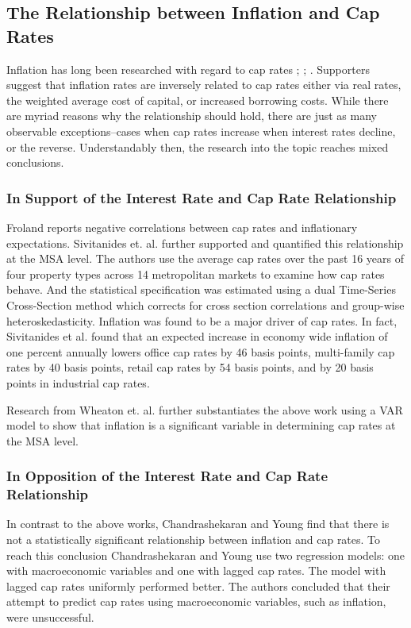 \subsection{The Relationship between Inflation and Cap Rates}

Inflation has long been researched with regard to cap rates \citep*{froland1987determines}; \citep*{sivitanides2001determinants}; \citep*{chandrashekaran2000predictability}. Supporters suggest that inflation rates are inversely related to cap rates either via real rates, the weighted average  cost of capital, or increased borrowing costs. While there are myriad reasons why the relationship should hold, there are just as many observable exceptions--cases when cap rates increase when interest rates decline, or the reverse. Understandably then, the research into the topic reaches mixed conclusions.

\subsubsection{In Support of the Interest Rate and Cap Rate Relationship}
Froland \citep*{froland1987determines} reports negative correlations between cap rates and inflationary expectations. Sivitanides et. al. \citep*{sivitanides2001determinants} further supported and quantified this relationship at the MSA level. The authors use the average cap rates over the past 16 years of four property types across 14 metropolitan markets to examine how cap rates behave. And the statistical specification was estimated using a dual Time-Series Cross-Section method which corrects for cross section correlations and group-wise heteroskedasticity. Inflation was found to be a major driver of cap rates. In fact, Sivitanides et al. found that an expected increase in economy wide inflation of one percent annually lowers office cap rates by 46 basis points, multi-family cap rates by 40 basis points, retail cap rates by 54 basis points, and by 20 basis points in industrial cap rates.

Research from Wheaton et. al. \citep*{wheaton2001real} further substantiates the above work using a VAR model to show that inflation is a significant variable in determining cap rates at the MSA level. 

\subsubsection{In Opposition of the Interest Rate and Cap Rate Relationship}
In contrast to the above works, Chandrashekaran and Young \citep*{chandrashekaran2000predictability} find that there is not a statistically significant relationship between inflation and cap rates. To reach this conclusion Chandrashekaran and Young use two regression models: one with macroeconomic variables and one with lagged cap rates. The model with lagged cap rates uniformly performed better. The authors concluded that their attempt to predict cap rates using macroeconomic variables, such as inflation, were unsuccessful. 

